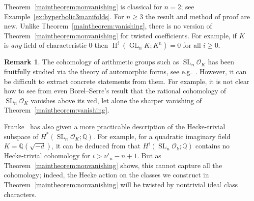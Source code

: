 \documentclass[11 pt]{article}
\theoremstyle{plain}
\theoremstyle{definition}
\newtheorem{remark}[theorem]{Remark}
\newtheorem{remarks}[theorem]{Remarks}
\numberwithin{equation}{section}
\DeclareMathOperator{\GL}{GL}
\DeclareMathOperator{\SL}{SL}
\newcommand\Q{\ensuremath{\mathbb{Q}}}
\DeclareMathOperator{\HH}{H}
\renewcommand{\O}{\mathcal{O}}
\DeclareMathOperator{\class}{cl}
\newcommand\abs[1]{\left\lvert#1\right\rvert}
\newcommand\SLvcd{\nu'_n}
\begin{document}
Theorem~\ref{maintheorem:nonvanishing} is classical for $n=2$; see
Example~\ref{ex:hyperbolic3manifolds}. For $n\geq 3$ the result and method of proof are new.
Unlike Theorem~\ref{maintheorem:vanishing}, there is no version of Theorem~\ref{maintheorem:nonvanishing}
for twisted coefficients.  For example, if $K$ is {\em any} field of characteristic $0$ then
$\HH^{i}(\GL_n K;K^n)=0$ for all $i \geq 0$.

\begin{remark}
The cohomology of arithmetic groups such as $\SL_n\O_K$ has been fruitfully studied via the theory of automorphic forms,
see e.g.\ \cite{FrankeMain,FrankeSchwermer}. However, it can be difficult to
extract concrete statements from them. For example, it is not clear how to see from \cite{FrankeMain} even Borel--Serre's
result that the rational cohomology of $\SL_n\O_K$ vanishes above its vcd, let alone the sharper vanishing of
Theorem~\ref{maintheorem:vanishing}.

Franke~\cite{FrankeTopological} has also given a more practicable description of the Hecke-trivial subspace of $H^*(\SL_n\O_K;\Q)$. 
For example, for a quadratic imaginary field $K=\Q(\sqrt{-d})$, it can be deduced from \cite[Theorem~9]{FrankeTopological} that $H^i(\SL_n\O_k;\Q)$ contains no Hecke-trivial cohomology for $i>\SLvcd-n+1$. 
But as Theorem~\ref{maintheorem:nonvanishing} shows, this cannot capture all the cohomology; indeed, the Hecke action on the classes we construct in Theorem~\ref{maintheorem:nonvanishing} will be twisted by nontrivial ideal class characters.
\end{remark}
%
%
\end{document}
